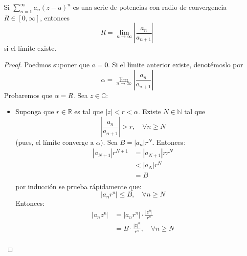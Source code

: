 \documentclass[12pt]{report}
\newcounter{it}
\theoremstyle{largebreak}
\newcommand\abs[1]{\ensuremath{\left|#1\right|}}
\begin{document}
    \begin{propo}
        Si $\sum_{ n=1}^\infty a_n(z-a)^n$ es una serie de potencias con radio de convergencia $R\in[0,\infty]$, entonces
        \begin{equation*}
            R=\lim_{n\rightarrow\infty}\abs{\frac{a_n}{a_{ n+1}}}
        \end{equation*}
        si el límite existe.
    \end{propo}

    \begin{proof}
        Poedmos suponer que $a=0$. Si el límite anterior existe, denotémoslo por
        \begin{equation*}
            \alpha=\lim_{n\rightarrow\infty}\abs{\frac{a_n}{a_{ n+1}}}
        \end{equation*}
        Probaremos que $\alpha=R$. Sea $z\in\mathbb{C}$:
        \begin{itemize}
            \item Suponga que $r\in\mathbb{R}$ es tal que $\abs{z}<r<\alpha$. Existe $N\in\mathbb{N}$ tal que
            \begin{equation*}
                \abs{\frac{a_{ n}}{a_{ n+1}}}>r,\quad\forall n\geq N
            \end{equation*}
            (pues, el límite converge a $\alpha$). Sea $B=\abs{a_n}r^N$. Entonces:
            \begin{equation*}
                \begin{split}
                    \abs{a_{ N+1}}r^{N+1}&=\abs{a_{ N+1}}rr^{N}\\
                    &<\abs{a_N}r^N\\
                    &=B\\
                \end{split}
            \end{equation*}
            por inducción se prueba rápidamente que:
            \begin{equation*}
                \abs{a_nr^n}\leq B,\quad\forall n\geq N
            \end{equation*}
            Entonces:
            \begin{equation*}
                \begin{split}
                    \abs{a_nz^n}&=\abs{a_nr^n}\cdot\frac{\abs{z^n}}{r^n}\\
                    &=B\cdot\frac{\abs{z}^n}{r^n},\quad\forall n\geq N \\
                \end{split}

\end{equation*}
\end{itemize}
\end{proof}
\end{document}
